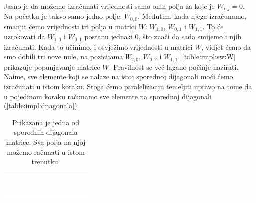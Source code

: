 \documentclass[times, utf8, zavrsni]{fer}
\begin{document}
Jasno je da možemo izračunati vrijednosti samo onih polja
za koje je $W_{i,j}=0$. Na početku je takvo samo jedno polje:
$W_{0,0}$. Međutim, kada njega izračunamo, smanjit ćemo
vrijednosti tri polja u matrici $W$: $W_{1,0}$, $W_{0,1}$ i
$W_{1,1}$. To će uzrokovati da $W_{1,0}$ i $W_{0,1}$ postanu
jednaki $0$, što znači da sada smijemo i njih izračunati.
Kada to učinimo, i osvježimo vrijednosti u matrici $W$, 
vidjet ćemo da smo dobili tri nove nule, na pozicijama
$W_{2,0}$, $W_{0,2}$ i $W_{1,1}$. \autoref{table:impl:sw:W}
prikazuje popunjavanje matrice $W$. Pravilnost se već
lagano počinje nazirati. Naime, sve elemente koji 
se nalaze na istoj sporednoj dijagonali moći ćemo 
izračunati u istom koraku. Stoga ćemo paralelizaciju
temeljiti upravo na tome da u pojedinom koraku
računamo sve elemente na sporednoj dijagonali (\autoref{table:impl:dijagonala}).

\begin{table}
\centering
\begin{tabularx}{240pt}{|R|R|R|R|R|R|R|R|R|R|R|R|}
 \hline
  &  &  &  &  &  &  &  &  &   &  &  \\ \hline
  &  &  &  &  &  &  &  &   &  &  &  \\ \hline
  &  &  &  &  &  &  &   &  &  &  &  \\ \hline
  &  &  &  &  &  &   &  &  &  &  &  \\ \hline
  &  &  &  &  &   &  &  &  &  &  &  \\ \hline
  &  &  &  &   &  &  &  &  &  &  &  \\ \hline
  &  &  &   &  &  &  &  &  &  &  &  \\ \hline
  &  &   &  &  &  &  &  &  &  &  &  \\ \hline
  &   &  &  &  &  &  &  &  &  &  &  \\ \hline
   &  &  &  &  &  &  &  &  &  &  &  \\ \hline
  &  &  &  &  &  &  &  &  &  &  &  \\ \hline
\end{tabularx}
\caption[Prikaz sporedne dijagonale]{Prikazana je jedna od sporednih
dijagonala matrice. Sva polja na njoj možemo računati u istom trenutku.}
\label{table:impl:dijagonala}
\end{table}
\end{document}
